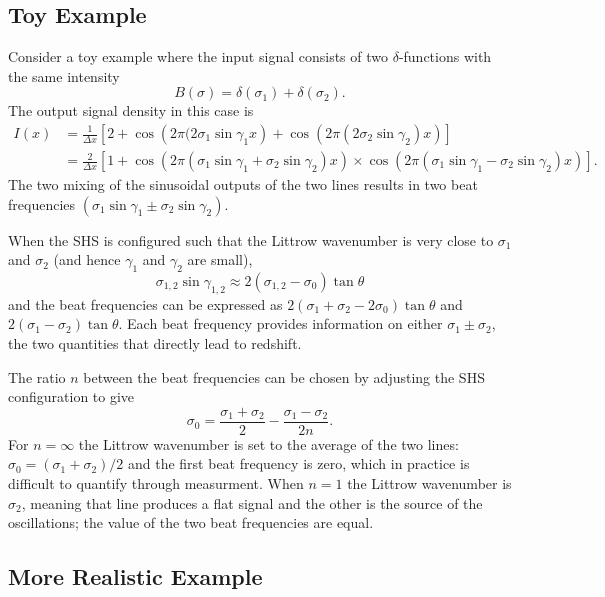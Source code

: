 \documentclass[preprint]{aastex}
\begin{document}
\subsection{Toy Example}
\label{toy:sec}
Consider a toy example where the input signal consists of two $\delta$-functions with the same intensity
\begin{equation}
B(\sigma)=\delta(\sigma_1)+\delta(\sigma_2).
\end{equation}
The output signal density in this case is
\begin{align}
I(x)&=\frac{1}{\Delta x}\left[2+ \cos{\left(2 \pi (2\sigma_1  \sin{\gamma_1}x \right)}+ \cos{\left(2\pi (2  \sigma_2  \sin{\gamma_2})x \right)}\right]\\
&=\frac{2}{\Delta x}\left[1+ \cos{\left(2 \pi  (\sigma_1  \sin{\gamma_1}+ \sigma_2  \sin{\gamma_2})x \right)}\times\cos{\left(2\pi  (\sigma_1  \sin{\gamma_1}- \sigma_2  \sin{\gamma_2})x\right)}\right].
\end{align}
The two mixing of the sinusoidal outputs of the two lines results in two beat frequencies $(\sigma_1  \sin{\gamma_1}\pm\sigma_2  \sin{\gamma_2})$.

When the SHS is configured such that the Littrow wavenumber is
very close to $\sigma_1$ and $\sigma_2$ (and hence $\gamma_1$ and $\gamma_2$
are small),
\begin{equation}
\sigma_{1,2}\sin{\gamma_{1,2}} \approx  2(\sigma_{1,2}-\sigma_0) \tan{\theta}
\end{equation}
and the beat frequencies can be expressed as
$2(\sigma_1+\sigma_2-2\sigma_0)\tan{\theta}$ and $2(\sigma_1-\sigma_2)\tan{\theta}$.
Each beat frequency provides information on either 
$\sigma_1\pm \sigma_2$, the two quantities that directly lead to redshift.

The ratio $n$ between the beat frequencies can be chosen by adjusting the SHS configuration to give
\begin{equation}
\sigma_0=\frac{\sigma_1+\sigma_2}{2}-\frac{\sigma_1-\sigma_2}{2n}.
\label{littrowchoices:eqn}
\end{equation}
For $n=\infty$  the Littrow wavenumber is set to the average of the two lines: $\sigma_0=(\sigma_1+\sigma_2)/2$ and the first beat frequency is zero,
which in practice is difficult to quantify through measurment.  When $n=1$ the Littrow wavenumber is $\sigma_2$, meaning that line produces a flat signal and the other is the source
of the oscillations; the value of the two beat frequencies are equal.


\subsection{More Realistic Example}
\end{document}
